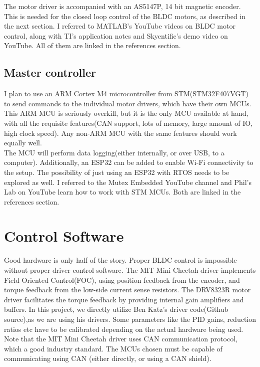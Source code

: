 \documentclass[a4paper]{article}
\begin{document}
			The motor driver is accompanied with an AS5147P, 14 bit magnetic encoder. This is needed for the closed loop control of the BLDC motors, as described in the next section. I referred to MATLAB's YouTube videos on BLDC motor control, along with TI's application notes and Skyentific's demo video on YouTube. All of them are linked in the references section.

		\subsection{Master controller}
			I plan to use an ARM Cortex M4 microcontroller from STM(STM32F407VGT) to send commands to the individual motor drivers, which have their own MCUs. This ARM MCU is seriously overkill, but it is the only MCU available at hand, with all the requisite features(CAN support, lots of memory, large amount of IO, high clock speed). Any non-ARM MCU with the same features should work equally well.\\

			The MCU will perform data logging(either internally, or over USB, to a computer). Additionally, an ESP32 can be added to enable Wi-Fi connectivity to the setup. The possibility of just using an ESP32 with RTOS needs to be explored as well. I referred to the Mutex Embedded YouTube channel and Phil's Lab on YouTube learn how to work with STM MCUs. Both are linked in the references section.

	\section{Control Software}
		Good hardware is only half of the story. Proper BLDC control is impossible without proper driver control software. The MIT Mini Cheetah driver implements Field Oriented Control(FOC), using position feedback from the encoder, and torque feedback from the low-side current sense resistors. The DRV8323R motor driver facilitates the torque feedback by providing internal gain amplifiers and buffers. In this project, we directly utilize Ben Katz's driver code(Github source),as we are using his drivers. Some parameters like the PID gains, reduction ratios etc have to be calibrated depending on the actual hardware being used.\\

		Note that the MIT Mini Cheetah driver uses CAN communication protocol, which a good industry standard. The MCUs chosen must be capable of communicating using CAN (either directly, or using a CAN shield).\\
\end{document}
